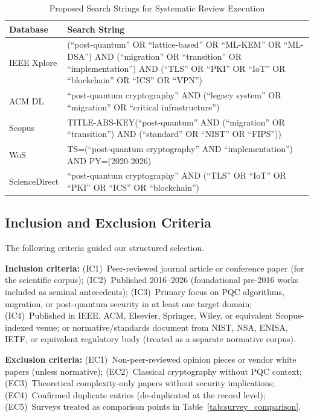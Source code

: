 \documentclass[journal]{IEEEtran}
\begin{document}
\begin{table}[!htbp]
\caption{Proposed Search Strings for Systematic Review Execution}
\label{tab:search_strings}
\centering
\footnotesize
\renewcommand{\arraystretch}{1.2}
\begin{tabular}{@{}lL{5.5cm}@{}}
\toprule
\textbf{Database} & \textbf{Search String} \\
\midrule
IEEE Xplore & (``post-quantum'' OR ``lattice-based'' OR ``ML-KEM'' OR ``ML-DSA'') AND (``migration'' OR ``transition'' OR ``implementation'') AND (``TLS'' OR ``PKI'' OR ``IoT'' OR ``blockchain'' OR ``ICS'' OR ``VPN'') \\
\addlinespace
ACM DL & ``post-quantum cryptography'' AND (``legacy system'' OR ``migration'' OR ``critical infrastructure'') \\
\addlinespace
Scopus & TITLE-ABS-KEY(``post-quantum'' AND (``migration'' OR ``transition'') AND (``standard'' OR ``NIST'' OR ``FIPS'')) \\
\addlinespace
WoS & TS=(``post-quantum cryptography'' AND ``implementation'') AND PY=(2020-2026) \\
\addlinespace
ScienceDirect & ``post-quantum cryptography'' AND (``TLS'' OR ``IoT'' OR ``PKI'' OR ``ICS'' OR ``blockchain'') \\
\bottomrule
\end{tabular}
\end{table}

\subsection{Inclusion and Exclusion Criteria}

The following criteria guided our structured selection.

\textbf{Inclusion criteria:}
(IC1)~Peer-reviewed journal article or conference paper (for the scientific corpus);
(IC2)~Published 2016--2026 (foundational pre-2016 works included as seminal antecedents);
(IC3)~Primary focus on PQC algorithms, migration, or post-quantum security in
at least one target domain;
(IC4)~Published in IEEE, ACM, Elsevier, Springer, Wiley, or equivalent Scopus-indexed
venue; or normative/standards document from NIST, NSA, ENISA, IETF, or equivalent
regulatory body (treated as a separate normative corpus).

\textbf{Exclusion criteria:}
(EC1)~Non-peer-reviewed opinion pieces or vendor white papers (unless normative);
(EC2)~Classical cryptography without PQC context;
(EC3)~Theoretical complexity-only papers without security implications;
(EC4)~Confirmed duplicate entries (de-duplicated at the record level);
(EC5)~Surveys treated as comparison points in Table~\ref{tab:survey_comparison}.
\end{document}
